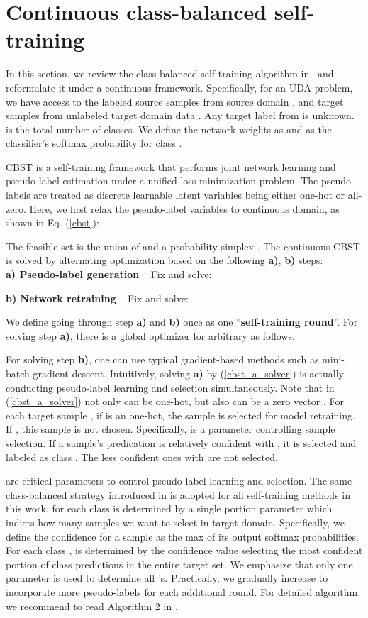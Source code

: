 \documentclass[10pt,twocolumn,letterpaper]{article}
\theoremstyle{plain}
\begin{document}
\section{Continuous class-balanced self-training}\label{sec:ccbst}
In this section, we review the class-balanced self-training algorithm in~\cite{Zou_2018_ECCV} and reformulate it under a continuous framework. Specifically, for an UDA problem, we have access to the labeled source samples  from source domain , and target samples  from unlabeled target domain data . Any target label  from  is unknown.  is the total number of classes. We define the network weights as  and  as the classifier's softmax probability for class .
 
CBST is a self-training framework that performs joint network learning and pseudo-label estimation under a unified loss minimization problem. The pseudo-labels are treated as discrete learnable latent variables being either one-hot or all-zero. Here, we first relax the pseudo-label variables to continuous domain, as shown in Eq. (\ref{cbst}):

The feasible set is the union of  and a probability simplex . The continuous CBST is solved by alternating optimization based on the following \textbf{a)}, \textbf{b)} steps:\\
\noindent \textbf{a) Pseudo-label generation} \label{a)} ~ Fix  and solve:

\textbf{b) Network retraining} \label{b)} ~ Fix  and solve:


We define going through step \textbf{a)} and \textbf{b)} once as one ``\textbf{self-training round}''. For solving step \textbf{a)}, there is a global optimizer for arbitrary  as follows.


For solving step \textbf{b)}, one can use typical gradient-based methods such as mini-batch gradient descent. Intuitively, solving \textbf{a)} by (\ref{cbst_a_solver}) is actually conducting pseudo-label learning and selection simultaneously. Note that  in (\ref{cbst_a_solver}) not only can be one-hot, but also can be a zero vector . For each target sample , if  is an one-hot, the sample is selected for model retraining. If , this sample is not chosen. Specifically,  is a parameter controlling sample selection. If a sample's predication is relatively confident with , it is selected and labeled as class . The less confident ones with  are not selected.

 are critical parameters to control pseudo-label learning and selection. The same class-balanced  strategy introduced in \cite{Zou_2018_ECCV} is adopted for all self-training methods in this work.  for each class  is determined by a single portion parameter  which indicts how many samples we want to select in target domain. Specifically, we define the confidence for a sample as the max of its output softmax probabilities. For each class ,  is determined by the confidence value selecting the most confident  portion of class  predictions in the entire target set. We emphasize that only one parameter  is used to determine all 's. Practically, we gradually increase  to incorporate more pseudo-labels for each additional round. For detailed algorithm, we recommend to read Algorithm 2 in \cite{Zou_2018_ECCV}.
\end{document}
